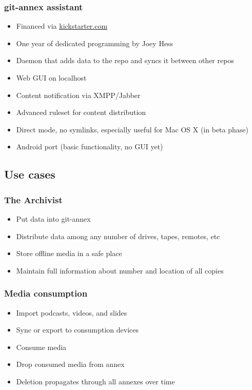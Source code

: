 \documentclass[t]{beamer}
\begin{document}
\begin{frame}
	\frametitle{git-annex assistant}
	\begin{itemize}
		\item Financed via \url{kickstarter.com}
		\item One year of dedicated programming by Joey Hess
		\item Daemon that adds data to the repo and syncs it between other repos
		\item Web GUI on localhost
		\item Content notification via XMPP/Jabber
		\item Advanced ruleset for content distribution
		\item Direct mode, no symlinks, especially useful for Mac OS X (in beta phase)
		\item Android port (basic functionality, no GUI yet)
	\end{itemize}
\end{frame}


\subsection{Use cases}

\begin{frame}
	\frametitle{The Archivist}
	\begin{itemize}
		\item Put data into git-annex
		\item Distribute data among any number of drives, tapes, remotes, etc
		\item Store offline media in a safe place
		\item Maintain full information about number and location of all copies
	\end{itemize}
\end{frame}

\begin{frame}
	\frametitle{Media consumption}
	\begin{itemize}
		\item Import podcasts, videos, and slides
		\item Sync or export to consumption devices
		\item Consume media
		\item Drop consumed media from annex
		\item Deletion propagates through all annexes over time
	\end{itemize}
\end{frame}
\end{document}
